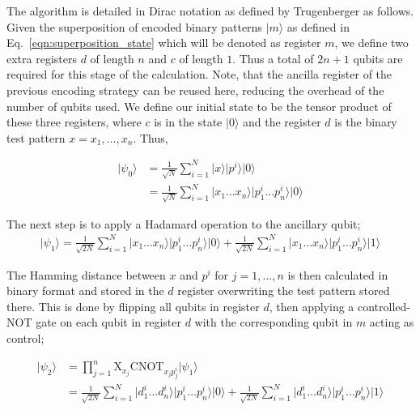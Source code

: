 The algorithm is detailed in Dirac notation as defined by Trugenberger \cite{Trugenberger_2001} as follows. Given the superposition of encoded binary patterns $\vert m \rangle$ as defined in Eq.~\eqref{eqn:superposition_state} which will be denoted as register $m$, we define two extra registers $d$ of length $n$ and $c$ of length $1$. Thus a total of $2n + 1$ qubits are required for this stage of the calculation. Note, that the ancilla register of the previous encoding strategy can be reused here, reducing the overhead of the number of qubits used. We define our initial state to be the tensor product of these three registers, where $c$ is in the state $\vert 0 \rangle$ and the register $d$ is the binary test pattern $x = x_1,\dots,x_n$. Thus,

\begin{align*}
    \vert \psi_0 \rangle &= \frac{1}{\sqrt{N}}\sum\limits_{i=1}^{N} \vert x \rangle \vert p^i \rangle \vert 0 \rangle \\
    &= \frac{1}{\sqrt{N}}\sum\limits_{i=1}^{N} \vert x_1\dots x_n\rangle\vert p_{1}^{i}\dots p_{n}^{i}\rangle \vert 0 \rangle
\end{align*}

The next step is to apply a Hadamard operation to the ancillary qubit;
\begin{align*}
    \vert \psi_1 \rangle = \frac{1}{\sqrt{2N}}\sum\limits_{i=1}^{N} \vert x_1\dots x_n\rangle\vert p_{1}^{i}\dots p_{n}^{i}\rangle \vert 0 \rangle + \frac{1}{\sqrt{2N}}\sum\limits_{i=1}^{N} \vert x_1\dots x_n\rangle\vert p_{1}^{i}\dots p_{n}^{i}\rangle \vert 1 \rangle
\end{align*}

The Hamming distance between $x$ and $p^i$ for $j=1,\dots, n$ is then calculated in binary format and stored in the $d$ register overwriting the test pattern stored there. This is done by flipping all qubits in register $d$, then applying a controlled-NOT gate on each qubit in register $d$ with the corresponding qubit in $m$ acting as control;

\begin{align*}
    \vert \psi_2 \rangle &= \prod\limits_{j=1}^{n}\textrm{X}_{x_j} \textrm{CNOT}_{x_{j}p_{j}^{i}} \vert \psi_1 \rangle\\
    &= \frac{1}{\sqrt{2N}}\sum\limits_{i=1}^{N} \vert d_1^i\dots d_n^i\rangle\vert p_{1}^{i}\dots p_{n}^{i}\rangle \vert 0 \rangle + \frac{1}{\sqrt{2N}}\sum\limits_{i=1}^{N} \vert d_1^i\dots d_n^i\rangle\vert p_{1}^{i}\dots p_{n}^{i}\rangle \vert 1 \rangle
\end{align*}

